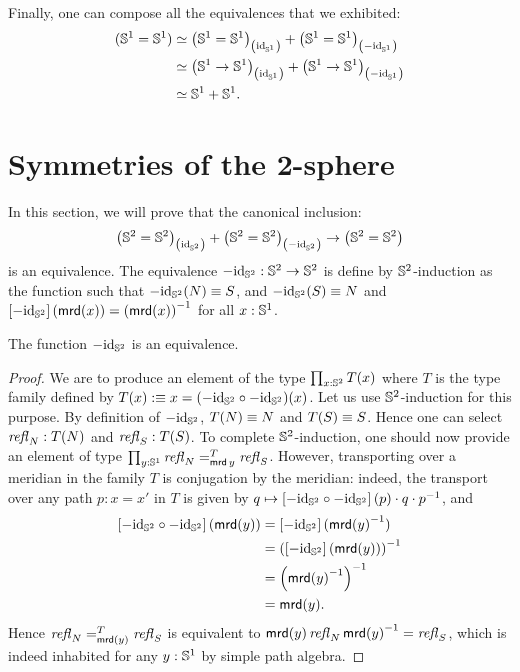 \documentclass[english,a4]{article}
\renewcommand{\ap}[1]{\left[{#1}\right]}
\begin{document}
Finally, one can compose all the equivalences that we exhibited:
\begin{align*}
  ({{\mathbb S^{1}}}={{\mathbb S^{1}}})
  & \simeq {\left({{\mathbb S^{1}}}= {{\mathbb S^{1}}}\right)}_{\left(\mathord{\mathrm{id}}_{{\mathbb S^{1}}}\right)}
    + {\left({{\mathbb S^{1}}} = {{\mathbb S^{1}}}\right)}_{\left(-\mathord{\mathrm{id}}_{{\mathbb S^{1}}}\right)}
  \\
  & \simeq {\left({{\mathbb S^{1}}}\to {{\mathbb S^{1}}}\right)}_{\left(\mathord{\mathrm{id}}_{{\mathbb S^{1}}}\right)}
    + {\left({{\mathbb S^{1}}} \to {{\mathbb S^{1}}}\right)}_{\left(-\mathord{\mathrm{id}}_{{\mathbb S^{1}}}\right)}
  \\
  & \simeq {{\mathbb S^{1}}} + {{\mathbb S^{1}}}.
\end{align*}

\section{Symmetries of the $\boldsymbol 2$-sphere}
\label{sec:sphere}

In this section, we will prove that the canonical inclusion:
\begin{equation}
  \label{eq:goal-section-sphere}
  {\left({{\mathbb S^{2}}}= {{\mathbb S^{2}}}\right)}_{\left(\mathord{\mathrm{id}}_{{\mathbb S^{2}}}\right)} +
  {\left({{\mathbb S^{2}}} = {{\mathbb S^{2}}}\right)}_{\left(-\mathord{\mathrm{id}}_{{\mathbb S^{2}}}\right)}
  \to 
  \left({{\mathbb S^{2}}} = {{\mathbb S^{2}}}\right)
\end{equation}
is an equivalence. The equivalence $-\mathord{\mathrm{id}}_{{\mathbb S^{2}}} : {{\mathbb S^{2}}} \to {{\mathbb S^{2}}}$ is
define by ${{\mathbb S^{2}}}$-induction as the function such that
$-\mathord{\mathrm{id}}_{{\mathbb S^{2}}}(N) \equiv S$, and $-\mathord{\mathrm{id}}_{{\mathbb S^{2}}}(S) \equiv N$ and
$\ap{-\id_\Sp}(\mrd(x)) = \inv{(\mrd(x))}$ for all $x:{{\mathbb S^{1}}}$. 

\begin{lemma}
  The function $-\mathord{\mathrm{id}}_{{\mathbb S^{2}}}$ is an equivalence.
  \label{lem:minus-id-equivalence}
\end{lemma}
\begin{proof}
  We are to produce an element of the type $\prod_{x:{{\mathbb S^{2}}}}T(x)$ where $T$ is the
  type family defined by $T(x)\mathrel{\hbox{:}\mkern-5mu\equiv} x= (-\mathord{\mathrm{id}}_{{\mathbb S^{2}}} \circ -\mathord{\mathrm{id}}_{{\mathbb S^{2}}})(x)$. Let us
  use ${{\mathbb S^{2}}}$-induction for this purpose. By definition of $-\mathord{\mathrm{id}}_{{\mathbb S^{2}}}$, $T(N)
  \equiv N$ and $T(S) \equiv S$. Hence one can select $\mathop{{\mathit{refl}}_{N}}:T(N)$ and $\mathop{{\mathit{refl}}_{S}}:T(S)$. To complete ${{\mathbb S^{2}}}$-induction, one should now provide an element of
  type $\prod_{y:{{\mathbb S^{1}}}} \mathop{{\mathit{refl}}_{N}} =^{T}_{\operatorname{\mathsf{mrd}} y} \mathop{{\mathit{refl}}_{S}}$. However,
  transporting over a meridian in the family $T$ is conjugation by the
  meridian: indeed, the transport over any path $p:x=x'$ in $T$ is given by
  $q\mapsto \ap{-\id_\Sp \circ -\id_\Sp}(p) \cdot q \cdot \inv p$, and
  \begin{align*}
    \ap{-\id_\Sp \circ -\id_\Sp} (\mrd(y)) 
     &= \ap{-\id_\Sp}(\inv {\mrd(y)}) 
    \\ &= \inv {\left( \ap{-\id_\Sp}(\mrd(y)) \right)} 
    \\ &= \inv { \left( \inv{\mrd(y)} \right) }
    \\ &= \mrd(y).
  \end{align*}
  Hence $\mathop{{\mathit{refl}}_{N}} =^{T}_{\operatorname{\mathsf{mrd}}(y)} \mathop{{\mathit{refl}}_{S}}$ is equivalent to
  $\operatorname{\mathsf{mrd}}(y)\mathop{{\mathit{refl}}_{N}} {\operatorname{\mathsf{mrd}}(y)}^{-1} = \mathop{{\mathit{refl}}_{S}}$, which is indeed inhabited for any
  $y:{{\mathbb S^{1}}}$ by simple path algebra.
\end{proof}
\end{document}
